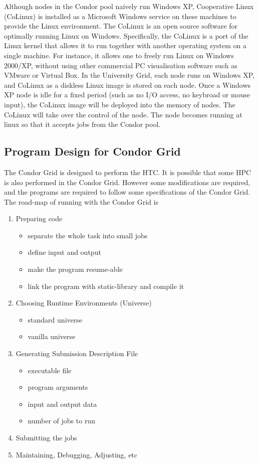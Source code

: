 Although nodes in the Condor pool naively run Windows XP,  Cooperative Linux (CoLinux) \cite{Aloni2004} is installed as a Microsoft Windows service on these machines to provide the Linux environment. The CoLinux is an open source software for optimally running Linux on Windows. Specifically, the CoLinux is a port of the Linux kernel that allows it to run together with another operating system on a single machine. For instance, it allows one to freely run Linux on Windows 2000/XP, without using other commercial PC visualisation software such as VMware or Virtual Box. In the University Grid, each node runs on Windows XP, and CoLinux as a diskless Linux image is stored on each node. Once a Windows XP node is idle for a fixed period (such as no I/O access, no keybroad or mouse input), the CoLinux image will be deployed into the memory of nodes. The CoLinux will take over the control of the node. The node becomes running at linux so that it accepts jobs from the Condor pool.

\subsection{Program Design for Condor Grid}
The Condor Grid is designed to perform the HTC. It is possible that some HPC is also performed in the Condor Grid. However some modifications are required, and the programs are required to follow some specifications of the Condor Grid. The road-map of running with the Condor Grid is 
\begin{enumerate}
 \item Preparing code
  \begin{itemize}
      \item separate the whole task into small jobs
     \item define input and output
     \item make the program resume-able
     \item link the program with static-library and compile it
  \end{itemize}
 \item Choosing Runtime Environments (Universe)
\begin{itemize}
 \item standard universe
 \item vanilla universe
\end{itemize}
 \item Generating Submission Description File
\begin{itemize}
 \item executable file
 \item program arguments
 \item input and output data
 \item number of jobs to run
\end{itemize}
 \item Submitting the jobs
 \item Maintaining, Debugging, Adjusting, etc
\end{enumerate}

